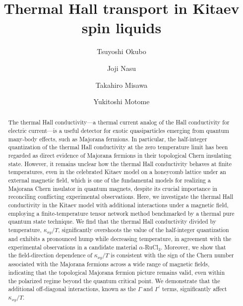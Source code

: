 \documentclass[twocolumn,superscriptaddress,showpacs, longbibliography, aps, prx]{revtex4-2}
\begin{document}
\title{Thermal Hall transport in Kitaev spin liquids}
\author{Tsuyoshi Okubo}
\author{Joji Nasu}
\author{Takahiro Misawa}
\author{Yukitoshi Motome}

\begin{abstract}
The thermal Hall conductivity---a thermal current analog of the Hall conductivity for electric current---is a useful detector for exotic quasiparticles emerging from quantum many-body effects, such as Majorana fermions.
In particular, the half-integer quantization of the thermal Hall conductivity at the zero temperature limit has been regarded as direct evidence of Majorana fermions in their topological Chern insulating state. 
However, it remains unclear how the thermal Hall conductivity behaves at finite temperatures, even in the celebrated Kitaev model on a honeycomb lattice under an external magnetic field, which is one of the fundamental models for realizing a Majorana Chern insulator in quantum magnets, despite its crucial importance in reconciling conflicting experimental observations. 
Here, we investigate the thermal Hall conductivity in the Kitaev model with additional interactions under a magnetic field, employing a finite-temperature tensor network method benchmarked by a thermal pure quantum state technique. 
We find that the thermal Hall conductivity divided by temperature, $\kappa_{xy}/T$, significantly overshoots the value of the half-integer quantization and exhibits a pronounced hump while decreasing temperature, in agreement with the experimental observations in a candidate material $\alpha$-RuCl$_{3}$. 
Moreover, we show that the field-direction dependence of $\kappa_{xy}/T$ is consistent with the sign of the Chern number associated with the Majorana fermions across a wide range of magnetic fields, indicating that the topological Majorana fermion picture remains valid, even within the polarized regime beyond the quantum critical point. 
We demonstrate that the additional off-diagonal interactions, known as the $\Gamma$ and $\Gamma^{\prime}$ terms, significantly affect $\kappa_{xy}/T$. 

\end{abstract}
\end{document}
